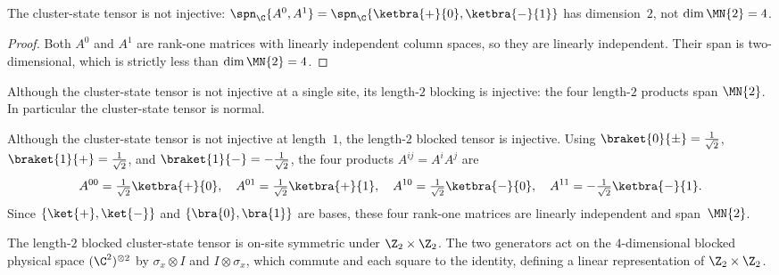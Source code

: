 \begin{theorem}\label{thm:cluster_not_injective}
    \leanok
    The cluster-state tensor is not injective:
    $\spn_{\C}\{A^0, A^1\} = \spn_{\C}\{\ketbra{+}{0}, \ketbra{-}{1}\}$
    has dimension~$2$, not $\dim \MN{2} = 4$.
\end{theorem}

\begin{proof}
    \leanok
    Both $A^0$ and $A^1$ are rank-one matrices with linearly
    independent column spaces, so they are linearly independent.
    Their span is two-dimensional, which is strictly less than
    $\dim \MN{2} = 4$.
\end{proof}

\begin{theorem}\label{thm:cluster_normal}
    \leanok
    Although the cluster-state tensor is not injective at a single site, its
    length-$2$ blocking is injective: the four length-$2$ products span
    $\MN{2}$. In particular the cluster-state tensor is normal.
\end{theorem}

\begin{remark}\label{rem:cluster_injective_blocked}
    Although the cluster-state tensor is not injective at length~$1$,
    the length-$2$ blocked tensor is injective. Using
    $\braket{0}{\pm} = \tfrac{1}{\sqrt{2}}$,
    $\braket{1}{+} = \tfrac{1}{\sqrt{2}}$, and
    $\braket{1}{-} = -\tfrac{1}{\sqrt{2}}$, the
    four products $A^{ij} = A^i A^j$ are
    \begin{equation}\label{eq:ex_cluster_blocked_products}
        A^{00} = \tfrac{1}{\sqrt{2}}\ketbra{+}{0},\quad
        A^{01} = \tfrac{1}{\sqrt{2}}\ketbra{+}{1},\quad
        A^{10} = \tfrac{1}{\sqrt{2}}\ketbra{-}{0},\quad
        A^{11} = -\tfrac{1}{\sqrt{2}}\ketbra{-}{1}.
    \end{equation}
    Since $\{\ket{+},\ket{-}\}$ and $\{\bra{0},\bra{1}\}$ are bases,
    these four rank-one matrices are linearly independent and
    span~$\MN{2}$.
\end{remark}

\begin{theorem}\label{thm:cluster_z2z2_symmetric}
    \leanok
    The length-$2$ blocked cluster-state tensor is on-site symmetric
    under $\Z_2 \times \Z_2$. The two generators act on the
    $4$-dimensional blocked physical space $(\C^2)^{\otimes 2}$ by
    $\sigma_x \otimes I$ and $I \otimes \sigma_x$,
    which commute and each square to the identity, defining a linear
    representation of $\Z_2 \times \Z_2$.
\end{theorem}

